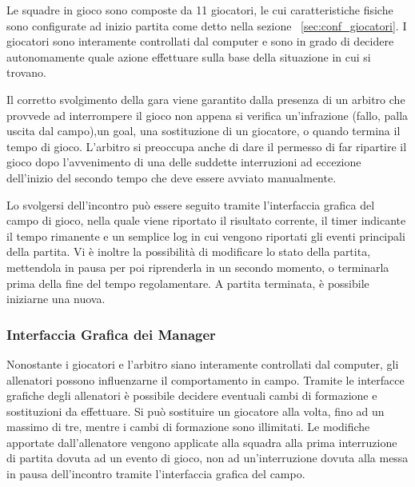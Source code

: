 Le squadre in gioco sono composte da 11 giocatori, le cui caratteristiche fisiche sono configurate ad inizio partita come detto nella sezione ~\ref{sec:conf_giocatori}. I giocatori sono interamente controllati dal computer e sono in grado di decidere autonomamente quale azione effettuare sulla base della situazione in cui si trovano.

Il corretto svolgimento della gara viene garantito dalla presenza di un arbitro che provvede ad interrompere il gioco non appena si verifica un'infrazione (fallo, palla uscita dal campo),un goal, una sostituzione di un giocatore, o quando termina il tempo di gioco. L'arbitro si preoccupa anche di dare il permesso di far ripartire il gioco dopo l'avvenimento di una delle suddette interruzioni ad eccezione dell'inizio del secondo tempo che deve essere avviato manualmente.

Lo svolgersi dell'incontro pu\`{o} essere seguito tramite l'interfaccia grafica del campo di gioco, nella quale viene riportato il risultato corrente, il timer indicante il tempo rimanente e un semplice log in cui vengono riportati gli eventi principali della partita. Vi \`{e} inoltre la possibilit\`{a} di modificare lo stato della partita, mettendola in pausa per poi riprenderla in un secondo momento, o terminarla prima della fine del tempo regolamentare. A partita terminata, \`{e} possibile iniziarne una nuova.

\subsubsection*{Interfaccia Grafica dei Manager}
%
\label{sec:gui_manager} 
Nonostante i giocatori e l'arbitro siano interamente controllati dal computer, gli allenatori possono influenzarne il comportamento in campo. Tramite le interfacce grafiche degli allenatori \`{e}  possibile decidere eventuali cambi di formazione e sostituzioni da effettuare. Si pu\`{o}  sostituire un giocatore alla volta, fino ad un massimo di tre, mentre i cambi di formazione sono illimitati. Le modifiche apportate dall'allenatore vengono applicate alla squadra alla prima interruzione di partita dovuta ad un evento di gioco, non ad un'interruzione dovuta alla messa in pausa dell'incontro tramite l'interfaccia grafica del campo.
